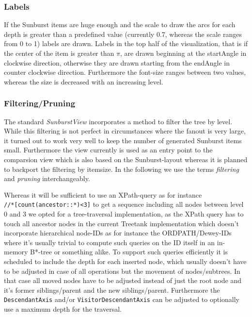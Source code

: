 \begin{itemize}
\subsubsection{Labels}
If the Sunburst items are huge enough and the scale to draw the arcs for each depth is greater than a predefined value (currently 0.7, whereas the scale ranges from 0 to 1) labels are drawn. Labels in the top half of the visualization, that is if the center of the item is greater than $\pi$, are drawn beginning at the startAngle in clockwise direction, otherwise they are drawn starting from the endAngle in counter clockwise direction. Furthermore the font-size ranges between two values, whereas the size is decreased with an increasing level. 

\subsubsection{Filtering/Pruning}
The standard \emph{SunburstView} incorporates a method to filter the tree by level. While this filtering is not perfect in circumstances where the fanout is very large, it turned out to work very well to keep the number of generated Sunburst items small. Furthermore the view currently is used as an entry point to the comparsion view which is also based on the Sunburst-layout whereas it is planned to backport the filtering by itemsize. In the following we use the terms \emph{filtering} and \emph{pruning} interchangeably.

Whereas it will be sufficient to use an XPath-query as for instance \\
\texttt{//*[count(ancestor::*)<3]} to get a sequence including all nodes between level 0 and 3 we opted for a tree-traversal implementation, as the XPath query has to touch all ancestor nodes in the current Treetank implementation which doesn't incorporate hierarchical node-IDs as for instance the ORDPATH/Dewey-IDs where it's usually trivial to compute such queries on the ID itself in an in-memory B*-tree or something alike. To support such queries efficiently it is scheduled to include the depth for each inserted node, which usually doesn't have to be adjusted in case of all operations but the movement of nodes/subtrees. In that case all moved nodes have to be adjusted instead of just the root node and it's former siblings/parent and the new siblings/parent. Furthermore the \texttt{DescendantAxis} and/or \texttt{VisitorDescendantAxis} can be adjusted to optionally use a maximum depth for the traversal.
\end{itemize}

